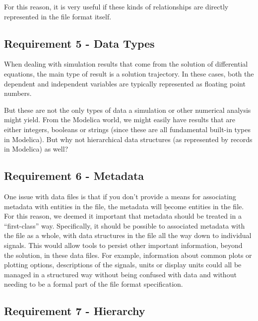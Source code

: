 \documentclass[11pt,a4paper,onecolumn]{article}
\begin{document}
For this reason, it is very useful if these kinds of relationships are
directly represented in the file format itself.

\subsection{Requirement 5 - Data Types}


When dealing with simulation results that come from the solution of
differential equations, the main type of result is a solution
trajectory.  In these cases, both the dependent and independent
variables are typically represented as floating point numbers.

But these are not the only types of data a simulation or other
numerical analysis might yield.  From the Modelica world, we might
easily have results that are either integers, booleans or strings
(since these are all fundamental built-in types in Modelica).  But why
not hierarchical data structures (as represented by records in
Modelica) as well?

\subsection{Requirement 6 - Metadata}


One issue with data files is that if you don't provide a means for
associating metadata with entities in the file, the metadata will {\b
become} entities in the file.  For this reason, we deemed it important
that metadata should be treated in a ``first-class'' way.
Specifically, it should be possible to associated metadata with the
file as a whole, with data structures in the file all the way down to
individual signals.  This would allow tools to persist other important
information, beyond the solution, in these data files.  For example,
information about common plots or plotting options, descriptions of
the signals, units or display units could all be managed in a
structured way without being confused with data and without needing to
be a formal part of the file format specification.

\subsection{Requirement 7 - Hierarchy}
\end{document}

